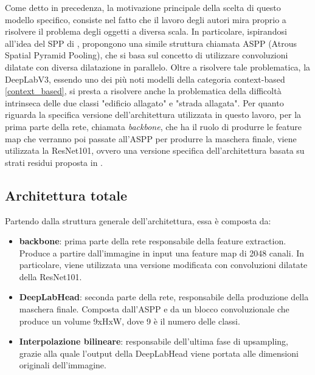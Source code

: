 Come detto in precedenza, la motivazione principale della scelta di questo modello specifico, consiste nel fatto che il lavoro degli autori mira proprio a risolvere il problema degli oggetti a diversa scala. In particolare, ispirandosi all'idea del SPP di \cite{pspnet}, propongono una simile struttura chiamata ASPP (Atrous Spatial Pyramid Pooling), che si basa sul concetto di utilizzare convoluzioni dilatate con diversa dilatazione in parallelo. Oltre a risolvere tale problematica, la DeepLabV3, essendo uno dei più noti modelli della categoria context-based \ref{context_based}, si presta a risolvere anche la problematica della difficoltà intrinseca delle due classi "edificio allagato" e "strada allagata".
Per quanto riguarda la specifica versione dell'architettura utilizzata in questo lavoro, per la prima parte della rete, chiamata \textit{backbone}, che ha il ruolo di produrre le feature map che verranno poi passate all'ASPP per produrre la maschera finale, viene utilizzata la ResNet101, ovvero una versione specifica dell'architettura basata su strati residui proposta in \cite{resnets}.









\subsection{Architettura totale}
Partendo dalla struttura generale dell'architettura, essa è composta da:
\begin{itemize}
    \item \textbf{backbone}: prima parte della rete responsabile della feature extraction. Produce a partire dall'immagine in input una feature map di 2048 canali. In particolare, viene utilizzata una versione modificata con convoluzioni dilatate della ResNet101.
    
    \item \textbf{DeepLabHead}: seconda parte della rete, responsabile della produzione della maschera finale. Composta dall'ASPP e da un blocco convoluzionale che produce un volume 9xHxW, dove 9 è il numero delle classi.
    
    \item \textbf{Interpolazione bilineare}: responsabile dell'ultima fase di upsampling, grazie alla quale l'output della DeepLabHead viene portata alle dimensioni originali dell'immagine.
\end{itemize}

